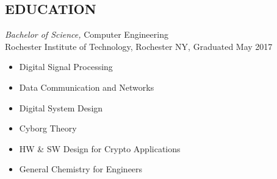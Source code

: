 \documentclass[line,mmmargin]{res}
\begin{document}
\begin{resume}


\section{EDUCATION} {\sl Bachelor of Science,} Computer Engineering \\ %
                Rochester Institute of Technology, Rochester NY, 
				Graduated May 2017 %
				\begin{multicols}{2}
					\begin{itemize}
						\itemsep -2pt
						\item[] Digital Signal Processing
						\item[] Data Communication and Networks
						\item[] Digital System Design
						\item[] Cyborg Theory
						\item[] HW \& SW Design for Crypto Applications
						\item[] General Chemistry for Engineers
					\end{itemize}
				\end{multicols}
 


\end{resume}
\end{document}
